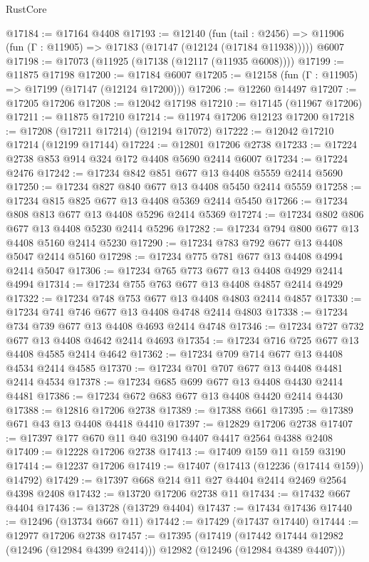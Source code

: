 \begin{lexlean}{RustCore}
\begin{coremodule}
@17184 := @17164 @4408
@17193 := @12140
    (fun (tail : @2456) => @11906 (fun (Γ : @11905) => @17183 (@17147 (@12124 (@17184 @11938)))))
    @6007
@17198 := @17073 (@11925 (@17138 (@12117 (@11935 @6008))))
@17199 := @11875 @17198
@17200 := @17184 @6007
@17205 := @12158 (fun (Γ : @11905) => @17199 (@17147 (@12124 @17200)))
@17206 := @12260 @14497
@17207 := @17205 @17206
@17208 := @12042 @17198
@17210 := @17145 (@11967 @17206)
@17211 := @11875 @17210
@17214 := @11974 @17206 @12123 @17200
@17218 := @17208 (@17211 @17214) (@12194 @17072)
@17222 := @12042 @17210 @17214 (@12199 @17144)
@17224 := @12801 @17206 @2738
@17233 := @17224 @2738 @853 @914 @324 @172 @4408 @5690 @2414 @6007
@17234 := @17224 @2476
@17242 := @17234 @842 @851 @677 @13 @4408 @5559 @2414 @5690
@17250 := @17234 @827 @840 @677 @13 @4408 @5450 @2414 @5559
@17258 := @17234 @815 @825 @677 @13 @4408 @5369 @2414 @5450
@17266 := @17234 @808 @813 @677 @13 @4408 @5296 @2414 @5369
@17274 := @17234 @802 @806 @677 @13 @4408 @5230 @2414 @5296
@17282 := @17234 @794 @800 @677 @13 @4408 @5160 @2414 @5230
@17290 := @17234 @783 @792 @677 @13 @4408 @5047 @2414 @5160
@17298 := @17234 @775 @781 @677 @13 @4408 @4994 @2414 @5047
@17306 := @17234 @765 @773 @677 @13 @4408 @4929 @2414 @4994
@17314 := @17234 @755 @763 @677 @13 @4408 @4857 @2414 @4929
@17322 := @17234 @748 @753 @677 @13 @4408 @4803 @2414 @4857
@17330 := @17234 @741 @746 @677 @13 @4408 @4748 @2414 @4803
@17338 := @17234 @734 @739 @677 @13 @4408 @4693 @2414 @4748
@17346 := @17234 @727 @732 @677 @13 @4408 @4642 @2414 @4693
@17354 := @17234 @716 @725 @677 @13 @4408 @4585 @2414 @4642
@17362 := @17234 @709 @714 @677 @13 @4408 @4534 @2414 @4585
@17370 := @17234 @701 @707 @677 @13 @4408 @4481 @2414 @4534
@17378 := @17234 @685 @699 @677 @13 @4408 @4430 @2414 @4481
@17386 := @17234 @672 @683 @677 @13 @4408 @4420 @2414 @4430
@17388 := @12816 @17206 @2738
@17389 := @17388 @661
@17395 := @17389 @671 @43 @13 @4408 @4418 @4410
@17397 := @12829 @17206 @2738
@17407 := @17397 @177 @670 @11 @40 @3190 @4407 @4417 @2564 @4388 @2408
@17409 := @12228 @17206 @2738
@17413 := @17409 @159 @11 @159 @3190
@17414 := @12237 @17206
@17419 := @17407 (@17413 (@12236 (@17414 @159)) @14792)
@17429 := @17397 @668 @214 @11 @27 @4404 @2414 @2469 @2564 @4398 @2408
@17432 := @13720 @17206 @2738 @11
@17434 := @17432 @667 @4404
@17436 := @13728 (@13729 @4404)
@17437 := @17434 @17436
@17440 := @12496 (@13734 @667 @11)
@17442 := @17429 (@17437 @17440)
@17444 := @12977 @17206 @2738
@17457 := @17395
    (@17419
      (@17442 @17444 @12982 (@12496 (@12984 @4399 @2414)))
      @12982
      (@12496 (@12984 @4389 @4407)))

\end{coremodule}
\end{lexlean}
